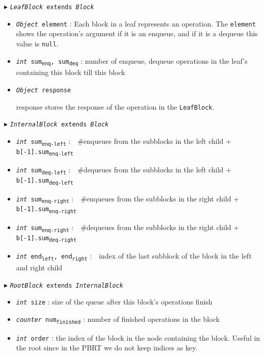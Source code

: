 \documentclass[10pt]{article}
\newcommand{\sub}[1]{\textsubscript{#1}}
\renewcommand{\tt}[1]{\texttt{#1}}
\renewcommand{\sl}[1]{\textsl{#1}}
\theoremstyle{definition}
\begin{document}
\begin{algorithm}
\begin{algorithmic}[1]
\begin{multicols}{2}
\Statex $\blacktriangleright$ \tt{\sl{LeafBlock} extends \sl{Block}}
\begin{itemize}
  \item \tt{\sl{Object} element}
  \textsf{: Each block in a leaf represents an operation. The \tt{element} shows the operation's argument if it is an enqueue, and if it is a dequeue this value is \tt{null}.}
  
    \item \tt{\sl{int} sum\sub{enq}, sum\sub{deq}}
  \textsf{: number of enqueue, dequeue operations in the leaf's containing this block till this block}

  
    \item \tt{\sl{Object} response}
  
  \textsf{response stores the response of the operation in the \tt{LeafBlock}.}
\end{itemize}

\Statex $\blacktriangleright$ \tt{\sl{InternalBlock} extends \sl{Block}}
\begin{itemize}
  \item \tt{\sl{int} sum\sub{enq-left}}
  \textsf{:~~\#enqueues from the subblocks in the left child + \tt{b[-1].sum\sub{enq-left}}}
  \item \tt{\sl{int} sum\sub{deq-left}}
  \textsf{:~~\#dequeues from the subblocks in the left child + \tt{b[-1].sum\sub{deq-left}}}
  \item \tt{\sl{int} sum\sub{enq-right}}
  \textsf{:~~\#enqueues from the subblocks in the right child + \tt{b[-1].sum\sub{enq-right}}}
  \item \tt{\sl{int} sum\sub{enq-right}}
  \textsf{:~~\#dequeues from the subblocks in the right child + \tt{b[-1].sum\sub{deq-right}}}
    \item \tt{\sl{int} end\sub{left}, end\sub{right}}
  \textsf{:~~index of the last subblock of the block in the left and right child}
\end{itemize}


\Statex $\blacktriangleright$ \tt{\sl{RootBlock} extends \sl{InternalBlock}}
\begin{itemize}
  \item \tt{\sl{int} size}
  \textsf{: size of the queue after this block's operations finish}
  \item \tt{\sl{counter} num\sub{finished}}
  \textsf{: number of finished operations in the block}
    \item \tt{\sl{int} order}
  \textsf{: the index of the block in the node containing the block. Useful in the root since in the PBRT we do not keep indices as key.}
\end{itemize}


\end{multicols}
\end{algorithmic}
\end{algorithm}
\end{document}
